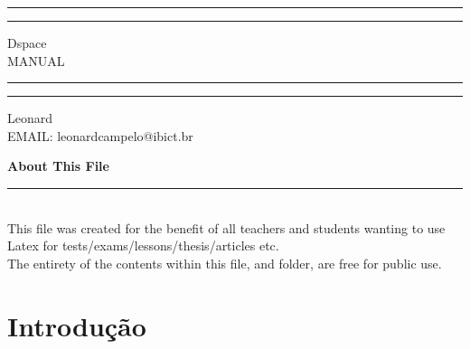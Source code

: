 \documentclass[12pt,hidelinks]{article}
\begin{document}
\begin{titlepage}
	\centering %
	\scshape %
	\vspace*{1.5\baselineskip} %

	\rule{13cm}{1.6pt}\vspace*{-\baselineskip}\vspace*{2pt} %
	\rule{13cm}{0.4pt} %
	
		\vspace{0.75\baselineskip} %
	{	\Huge Dspace\\ 
			\vspace{4mm}
		MANUAL  \\	}
		\vspace{0.75\baselineskip} %
	\rule{13cm}{0.4pt}\vspace*{-\baselineskip}\vspace{3.2pt} %
	\rule{13cm}{1.6pt} %
	
		\vspace{1.75\baselineskip} %
	{\large Leonard \\
		\vspace*{1.2\baselineskip}
	EMAIL: leonardcampelo@ibict.br} \\
	\vfill

\end{titlepage}
\tableofcontents
\vfill
\small{\noindent \textbf{About This File} \vspace{-3mm}\\
\noindent \rule{3.3cm}{0.5pt} \\
This file was created for the benefit of all teachers and students wanting to use Latex for tests/exams/lessons/thesis/articles etc.\\
The entirety of the contents within this file, and folder, are free for public use.}
\newpage
{}
\section{Introdução}
\newpage
\end{document}
